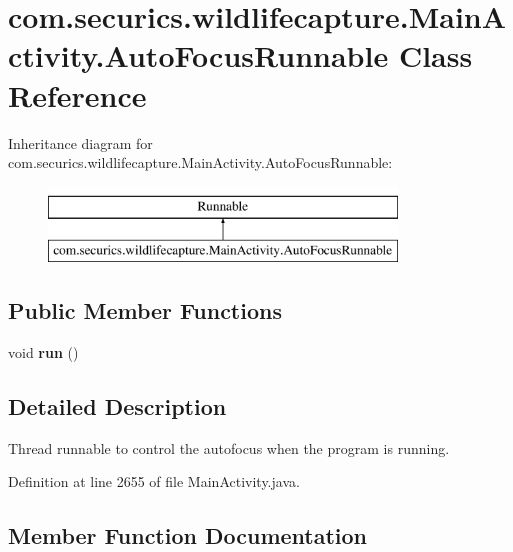 \section{com.\+securics.\+wildlifecapture.\+Main\+Activity.\+Auto\+Focus\+Runnable Class Reference}
\label{classcom_1_1securics_1_1wildlifecapture_1_1_main_activity_1_1_auto_focus_runnable}
Inheritance diagram for com.\+securics.\+wildlifecapture.\+Main\+Activity.\+Auto\+Focus\+Runnable\+:\begin{figure}[H]
\begin{center}
\leavevmode
\includegraphics[height=2.000000cm]{classcom_1_1securics_1_1wildlifecapture_1_1_main_activity_1_1_auto_focus_runnable}
\end{center}
\end{figure}
\subsection*{Public Member Functions}
\begin{DoxyCompactItemize}
\item 
void {\bf run} ()
\end{DoxyCompactItemize}


\subsection{Detailed Description}
Thread runnable to control the autofocus when the program is running. 

Definition at line 2655 of file Main\+Activity.\+java.



\subsection{Member Function Documentation}

